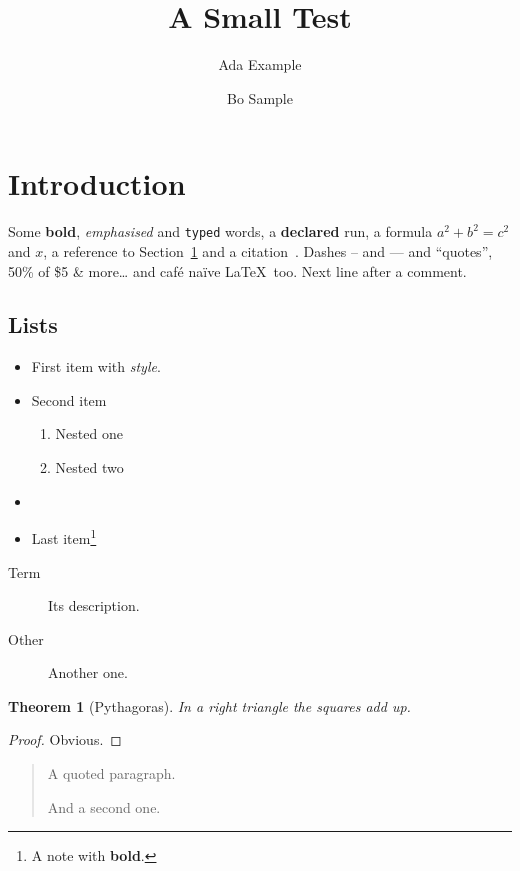 \documentclass{article}
\title{A Small Test}
\author{Ada Example \and Bo Sample}
\newtheorem{theorem}{Theorem}[section]
\begin{document}
\maketitle

\section{Introduction}\label{sec:intro}

Some \textbf{bold}, \emph{emphasised} and \texttt{typed} words, a {\bfseries declared} run,
a formula $a^2 + b^2 = c^2$ and \(x\), a reference to Section~\ref{sec:intro} and a
citation~\cite{knuth84}. Dashes -- and --- and ``quotes'', 50\% of \$5 \& more\dots{} and
caf\'e na\"ive \LaTeX\ too.%
Next line after a comment.

\subsection{Lists}

\begin{itemize}
  \item First item with \textit{style}.
  \item Second item
  \begin{enumerate}
    \item Nested one
    \item Nested two
  \end{enumerate}
  \item
  \item Last item\footnote{A note with \textbf{bold}.}
\end{itemize}

\begin{description}
  \item[Term] Its description.
  \item[Other] Another one.
\end{description}

\begin{theorem}[Pythagoras]\label{thm:p}
In a right triangle the squares add up.
\end{theorem}

\begin{proof}
Obvious.
\end{proof}

\begin{quote}
A quoted paragraph.

And a second one.
\end{quote}
\end{document}
